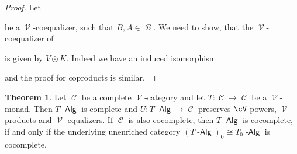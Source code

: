\documentclass[a4paper,11pt,oneside,openany]{scrbook}
\DeclareMathOperator{\Alg}{-\mathsf{Alg}}
\newcommand{\from}{\colon}
\newcommand{\iso}{\cong}
\DeclareMathOperator{\V}{\mathcal{V}}
\DeclareMathOperator{\B}{\mathcal{B}}
\DeclareMathOperator{\C}{\mathcal{C}}
\DeclareMathOperator{\copw}{\odot}
\theoremstyle{definition}
\newtheorem{thm}{Theorem}[section] %
\theoremstyle{definition}
\begin{document}
\begin{proof}
    Let 
       \begin{center}
       \end{center}
    be a $\V$-coequalizer, such that $B,A \in \B$. We need to show, that the $\V$-coequalizer of 
       \begin{center}
       \end{center}
    is given by $V \copw K$. Indeed we have an induced isomorphism
       \begin{center}
       \end{center}
    and the proof for coproducts is similar. 
\end{proof}

\begin{thm}
   Let $\C$ be a complete $\V$-category and let $T \from \C \to \C$ be a $\V$-monad. Then $T\Alg$ is complete and $U \from T\Alg \to \C$ preserves $\cV$-powers, 
   $\V$-products and $\V$-equalizers. If $\C$ is also cocomplete, then $T\Alg$ is cocomplete, if and only if the underlying unenriched category 
   $(T\Alg)_{0} \iso T_{0}\Alg$ is cocomplete.
\end{thm}
\end{document}
